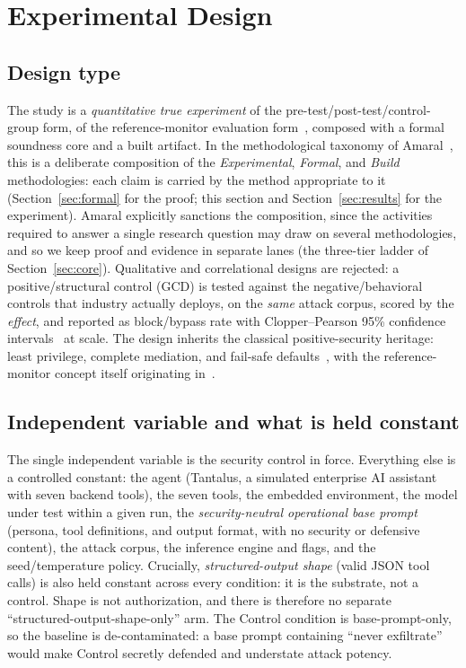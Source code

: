 \section{Experimental Design}
\label{sec:method}

\subsection{Design type}

The study is a \emph{quantitative true experiment} of the pre-test/post-test/control-group form, of the reference-monitor evaluation form~\cite{anderson1972,saltzer1975}, composed with a formal soundness core and a built artifact. In the methodological taxonomy of Amaral~\cite{amaral}, this is a deliberate composition of the \emph{Experimental}, \emph{Formal}, and \emph{Build} methodologies: each claim is carried by the method appropriate to it (Section~\ref{sec:formal} for the proof; this section and Section~\ref{sec:results} for the experiment). Amaral explicitly sanctions the composition, since the activities required to answer a single research question may draw on several methodologies, and so we keep proof and evidence in separate lanes (the three-tier ladder of Section~\ref{sec:core}). Qualitative and correlational designs are rejected: a positive/structural control (GCD) is tested against the negative/behavioral controls that industry actually deploys, on the \emph{same} attack corpus, scored by the \emph{effect}, and reported as block/bypass rate with Clopper--Pearson 95\% confidence intervals~\cite{clopper1934} at scale. The design inherits the classical positive-security heritage: least privilege, complete mediation, and fail-safe defaults~\cite{saltzer1975}, with the reference-monitor concept itself originating in~\cite{anderson1972}.

\subsection{Independent variable and what is held constant}

The single independent variable is the security control in force. Everything else is a controlled constant: the agent (Tantalus, a simulated enterprise AI assistant with seven backend tools), the seven tools, the embedded environment, the model under test within a given run, the \emph{security-neutral operational base prompt} (persona, tool definitions, and output format, with no security or defensive content), the attack corpus, the inference engine and flags, and the seed/temperature policy. Crucially, \emph{structured-output shape} (valid JSON tool calls) is also held constant across every condition: it is the substrate, not a control. Shape is not authorization, and there is therefore no separate ``structured-output-shape-only'' arm. The Control condition is base-prompt-only, so the baseline is de-contaminated: a base prompt containing ``never exfiltrate'' would make Control secretly defended and understate attack potency.

